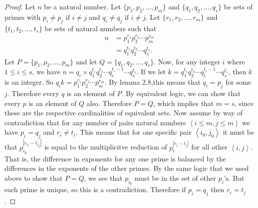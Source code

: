 \documentclass[12pt,leqno]{article}
\numberwithin{equation}{section}
\theoremstyle{definition}
\newcommand{\card}[1]{\left| #1 \right|}
\newcommand{\pair}[2]{\left\langle #1, #2 \right\rangle}
\begin{document}
\begin{proof}[Proof]
Let $n$ be a natural number.  Let $\{p_1, p_2, \hdots, p_m\}$ and $\{q_1, q_2, \hdots, q_s\}$ be sets of primes with $p_i \neq p_j$ if $i \neq j$ and $q_i \neq q_j$ if $i \neq j$. Let $\{r_1, r_2, \hdots, r_m\}$ and $\{t_1, t_2, \hdots, t_s\}$ be sets of natural numbers such that
\begin{align*}
n & = p_1^{r_1}p_2^{r_2}\cdots p_m^{r_m} \\
  & = q_1^{t_1}q_2^{t_2}\cdots q_s^{t_s}.
\end{align*}
Let $P = \{p_1, p_2, \hdots, p_m\}$ and let $Q = \{q_1, q_2, \hdots, q_s\}$.  Now, for any integer $i$ where $1 \leq i \leq s$, we have $n = q_i \times q_1^{t_1}q_2^{t_2}\cdots q_i^{t_i-1} \cdots q_s^{t_s}$.  If we let $k = q_1^{t_1}q_2^{t_2}\cdots q_i^{t_i-1} \cdots q_s^{t_s}$, then $k$ is an integer.  So $q_ik = p_1^{r_1}p_2^{r_2}\cdots p_m^{r_m}$.  By lemma 2.8,this means that $q_i = p_j$ for some $j$. Therefore every $q$ is an element of $P$.  By equivalent logic, we can show that every $p$ is an element of $Q$ also.  Therefore $P = Q$, which implies that $m = s$, since these are the respective cardinalities of equivalent sets.  Now assume by way of contradiction that for any number of pairs natural numbers $\pair{i \leq m}{j \leq m}$ we have $p_i = q_j$ and $r_i \neq t_i$.  This means that for one specific pair $\pair{i_0}{j_0}$ it must be that $p_{i_0}^{\card{r_{i_0}-t_{j_0}}}$ is equal to the multiplicitve reduction of $p_i^{\card{r_i-t_j}}$ for all other $\pair{i}{j}$.  That is, the difference in exponents for any one prime is balanced by the differences in the exponents of the other primes.  By the same logic that we used above to show that $P = Q$, we see that $p_{i_0}$ must be in the set of other $p_i$'s.  But each prime is unique, so this is a contradiction.  Therefore if $p_i = q_j$ then $r_i = t_j$.
\end{proof}
\end{document}
